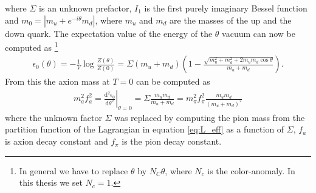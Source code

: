\documentclass[twoside,a4paper, 12pt]{article}
\newcommand{\diff}{\mathrm{d}}
\numberwithin{equation}{section}
\begin{document}
where $\Sigma$ is an unknown prefactor, $I_1$ is the first purely imaginary Bessel function and $m_0 = |m_u + e^{- i \theta} m_d|$,
where $m_u$ and $m_d$ are the masses of the up and the down quark.
The expectation value of the energy of the $\theta$ vacuum can now be computed as \cite[Sec. IX, Eq. 9.5]{Leutwyler:1992yt} \footnote{In general we have to replace $\theta$ by $N_C \theta$, where
$N_c$ is the color-anomaly. \cite[Sec. 2.2]{MarshAxionCosmo} In this thesis we set $N_c = 1$.}
\begin{align}
    \label{eq:zero_temp_potential}
   \epsilon_0(\theta) = - \frac{1}{V} \log \frac{Z(\theta)}{Z(0)} =
   \Sigma (m_u + m_d) \left( 1 - \frac{\sqrt{m_u^2 + m_d^2 + 2 m_u m_d \cos \theta}}{m_u + m_d}\right).
\end{align}
From this the axion mass at $T = 0$ can be computed as \cite[Sec. IV, Eq. 9.7]{Leutwyler:1992yt}
\begin{align}
    \label{eq:axion_mass_at_zero_T}
    m_a^2 f_a^2 =
    \left. \frac{\diff^2 \epsilon_0}{\diff \theta^2} \right|_{\theta = 0} = \Sigma \frac{m_u m_d}{m_u + m_d}
    = m_\pi^2 f_\pi^2 \frac{m_u m_d}{(m_u + m_d)^2}
\end{align}
where the unknown factor $\Sigma$ was replaced by computing the pion mass from the partition function of the Lagrangian in equation \eqref{eq:L_eff} as a function of $\Sigma$,
$f_a$ is axion decay constant and $f_\pi$ is the pion decay constant.
\end{document}
